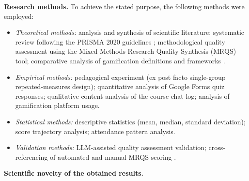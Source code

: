 {\textbf{Research methods.} To achieve the stated purpose, the following methods were employed:
\begin{itemize}
\item \textit{Theoretical methods:} analysis and synthesis of scientific literature; systematic review following the PRISMA 2020 guidelines \citep{Page2021}; methodological quality assessment using the Mixed Methods Research Quality Synthesis (MRQS) tool; comparative analysis of gamification definitions and frameworks \cite{Deterding2011, DichevDicheva2017}.
\item \textit{Empirical methods:} pedagogical experiment (ex post facto single-group repeated-measures design); quantitative analysis of Google Forms quiz responses; qualitative content analysis of the course chat log; analysis of gamification platform usage.
\item \textit{Statistical methods:} descriptive statistics (mean, median, standard deviation); score trajectory analysis; attendance pattern analysis.
\item \textit{Validation methods:} LLM-assisted quality assessment validation; cross-referencing of automated and manual MRQS scoring \cite{Korniienko2025mrqs, LandisKoch1977}.
\end{itemize}

\textbf{Scientific novelty of the obtained results.}

}
